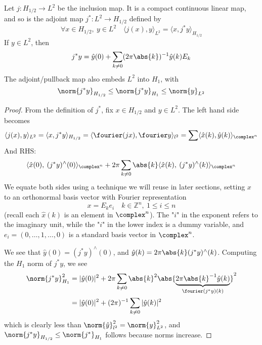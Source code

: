 \documentclass[../main-v2-manifolds.tex]{subfiles}
\begin{document}
\begin{wts}
Let $j: H_{1/2}\to L^2$ be the inclusion map. It is a compact continuous linear map, and so is the adjoint map $j^*: L^2\to H_{1/2}$ defined by
\[
\forall x\in H_{1/2},\: y\in L^2\quad \langle j(x),y\rangle_{L^2} = \langle x,j^*y\rangle_{H_{1/2}}
\]
If $y\in L^2$, then
\[
j^*y = \hat{y}(0) + \sum_{k\neq 0}(2\pi\abs{k})^{-1}\hat{y}(k)E_k
\]
The adjoint/pullback map also embeds $L^2$ into $H_1$, with
\[
\norm{j^*y}_{H_{1/2}}\leq \norm{j^*y}_{H_1}\leq \norm{y}_{L^2}
\]
\end{wts}
\begin{proof}
From the definition of $j^*$, fix $x\in H_{1/2}$ and $y\in L^2$. The left hand side  becomes
\[
\langle j(x), y\rangle_{L^2} = \langle x,j^*y\rangle_{H_{1/2}} = \langle \fourier(jx),\fourier y\rangle_{l^2}= \sum \langle \hat{x}(k),\hat{y}(k)\rangle_{\complex^n}
\]
And RHS:
\[
\langle \hat{x}(0),\:(j^*y)^{\wedge}(0)\rangle_{\complex^n} + 2\pi\sum_{k\neq 0}\abs{k}\langle \hat{x}(k),\: (j^*y)^{\wedge}(k)\rangle_{\complex^n}
\]
We equate both sides using a technique we will reuse in later sections, setting $x$ to an orthonormal basis vector with Fourier representation 
\[
x = E_ke_i\quad k\in\mathbb{Z}^n,\: 1\leq i\leq n
\]
(recall each $\hat{x}(k)$ is an element in $\complex^n$). The "$i$" in the exponent refers to the imaginary unit, while the "$i$" in the lower index is a dummy variable, and $e_i = (0,\ldots,1,\ldots,0)$ is a standard basis vector in $\complex^n$.

We see that $\hat{y}(0) = (j^*y)^{\wedge}(0)$, and $\hat{y}(k)=2\pi \abs{k} (j^*y)^{\wedge}(k)$. Computing the $H_{1}$ norm of $j^*y$, we see
\begin{align*}
\norm{j^*y}^2_{H_{1}} &= \vert \hat{y}(0)\vert^2 + 2\pi\sum_{k\neq 0}\abs{k}^2\abs{ \underbrace{2\pi\abs{k}^{-1}\hat{y}(k)}_{\fourier(j^* y)(k)}}^2\\
&= \vert \hat{y}(0)\vert^2 + (2\pi)^{-1}\sum_{k\neq 0}\vert \hat{y}(k)\vert^2
\end{align*}
which is clearly less than $\norm{\hat{y}}^2_{l^2} = \norm{y}^2_{L^2}$, and $\norm{j^*y}_{H_{1/2}}\leq \norm{j^*}_{H_1}$ follows because norms increase.
\end{proof}
%
%
%
%
%
\end{document}
